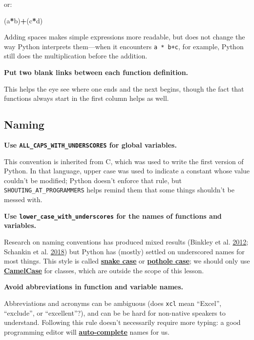 \documentclass[
]{krantz}
\makeatletter
\newenvironment{Shaded}{\begin{snugshade}}{\end{snugshade}}
\newcommand{\NormalTok}[1]{#1}
\newcommand{\OperatorTok}[1]{\textcolor[rgb]{0.81,0.36,0.00}{\textbf{#1}}}
\newenvironment{kframe}{%
\medskip{}
\setlength{\fboxsep}{.8em}
 \def\at@end@of@kframe{}%
 \ifinner\ifhmode%
  \def\at@end@of@kframe{\end{minipage}}%
  \begin{minipage}{\columnwidth}%
 \fi\fi%
 \def\FrameCommand##1{\hskip\@totalleftmargin \hskip-\fboxsep
 \colorbox{shadecolor}{##1}\hskip-\fboxsep
     \hskip-\linewidth \hskip-\@totalleftmargin \hskip\columnwidth}%
 \MakeFramed {\advance\hsize-\width
   \@totalleftmargin\z@ \linewidth\hsize
   \@setminipage}}%
 {\par\unskip\endMakeFramed%
 \at@end@of@kframe}
\renewenvironment{Shaded}{\begin{kframe}}{\end{kframe}}
\newcommand{\gref}[2]{\hyperlink{#2}{\textbf{#1}}}
\makeatother
\begin{document}
or:

\begin{Shaded}
\begin{Highlighting}[]
\NormalTok{(a}\OperatorTok{*}\NormalTok{b)}\OperatorTok{+}\NormalTok{(c}\OperatorTok{*}\NormalTok{d)}
\end{Highlighting}
\end{Shaded}

Adding spaces makes simple expressions more readable,
but does not change the way Python interprets them---when it encounters \texttt{a~*~b+c},
for example,
Python still does the multiplication before the addition.

\textbf{Put two blank links between each function definition.}

This helps the eye see where one ends and the next begins,
though the fact that functions always start in the first column helps as well.

\hypertarget{naming}{%
\subsection{Naming}\label{naming}}

\textbf{Use \texttt{ALL\_CAPS\_WITH\_UNDERSCORES} for global variables.}

This convention is inherited from C,
which was used to write the first version of Python.
In that language,
upper case was used to indicate a constant whose value couldn't be modified;
Python doesn't enforce that rule,
but \texttt{SHOUTING\_AT\_PROGRAMMERS} helps remind them that
some things shouldn't be messed with.

\textbf{Use \texttt{lower\_case\_with\_underscores} for the names of functions and variables.}

Research on naming conventions has produced mixed results (Binkley et al. \protect\hyperlink{ref-Bink2012}{2012}; Schankin et al. \protect\hyperlink{ref-Scha2018}{2018})
but Python has (mostly) settled on underscored names for most things.
This style is called \gref{snake case}{snake\_case} or \gref{pothole case}{pothole\_case};
we should only use \gref{CamelCase}{camel\_case} for classes,
which are outside the scope of this lesson.

\textbf{Avoid abbreviations in function and variable names.}

Abbreviations and acronyms can be ambiguous
(does \texttt{xcl} mean ``Excel'', ``exclude'', or ``excellent''?),
and can be be hard for non-native speakers to understand.
Following this rule doesn't necessarily require more typing:
a good programming editor will \gref{auto-complete}{auto\_completion} names for us.
\end{document}
